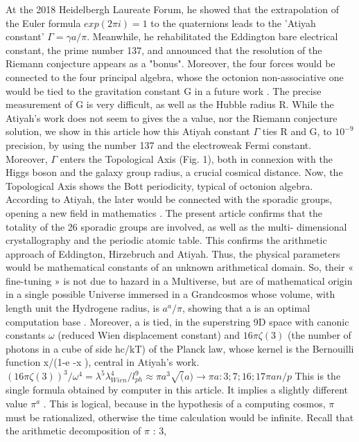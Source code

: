 \documentclass[a4paper,9pt]{article}
\begin{document}
At the 2018 Heidelbergh Laureate Forum,
he showed that the extrapolation of the Euler formula $exp(2\pi i) = 1$ to the quaternions leads to the
'Atiyah constant' $\Gamma = \gamma a/\pi$. Meanwhile, he rehabilitated the Eddington bare electrical constant, the
prime number 137, and announced that the resolution of the Riemann conjecture appears as a
"bonus". Moreover, the four forces would be connected to the four principal algebra, whose the
octonion non-associative one would be tied to the gravitation constant G in a future work \cite{Atiyah}.
The precise measurement of G is very difficult, as well as the Hubble radius R. While the Atiyah's
work does not seem to gives the a value, nor the Riemann conjecture solution, we show in this
article how this Atiyah constant $\Gamma$ ties R and G, to $10^{-9}$ precision, by using the number 137 and the
electroweak Fermi constant. Moreover, $\Gamma$ enters the Topological Axis (Fig. 1), both in connexion
with the Higgs boson and the galaxy group radius, a crucial cosmical distance. Now, the
Topological Axis shows the Bott periodicity, typical of octonion algebra. According to Atiyah, the
later would be connected with the sporadic groups, opening a new field in mathematics \cite{Atiyah2}. The
present article confirms that the totality of the 26 sporadic groups are involved, as well as the multi-
dimensional crystallography and the periodic atomic table. This confirms the arithmetic approach of
Eddington, Hirzebruch and Atiyah.
Thus, the physical parameters would be mathematical constants of an unknown arithmetical
domain. So, their « fine-tuning » is not due to hazard in a Multiverse, but are of mathematical origin
in a single possible Universe immersed in a Grandcosmos whose volume, with length unit the
Hydrogene radius, is $a^a /\pi$, showing that a is an optimal computation base \cite{Sanchez1}. Moreover, a is tied, in
the superstring 9D space with canonic constants $\omega$ (reduced Wien displacement constant) and
$16\pi \zeta(3)$ (the number of photons in a cube of side hc/kT) of the Planck law, whose kernel is the
Bernouilli function x/(1-e -x ), central in Atiyah's work.
$(16\pi \zeta(3))^3 /\omega^4 = \lambda^5 \lambda_{Wien}^4 /l_{ph}^9 \approx \pi a^3 \sqrt(a) \rightarrow \pi a : 3;7;16;17\pi a n/p$
This is the single formula obtained by computer in this article. It implies a slightly different value
$\pi^a$ . This is logical, because in the hypothesis of a computing cosmos, $\pi$ must be rationalized,
otherwise the time calculation would be infinite. Recall that the arithmetic decomposition of $\pi$ : 3,
\end{document}

